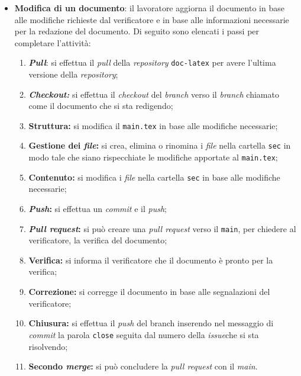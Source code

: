 \begin{itemize}
	\item \textbf{Modifica di un documento}: il lavoratore aggiorna il documento
	      in base alle modifiche richieste dal verificatore e in base alle
	      informazioni necessarie per la redazione del documento. Di seguito sono
	      elencati i passi per completare l'attività:
	      \begin{enumerate}
		      \item \textbf{\textit{Pull}}: si effettua il \textit{pull}
		            della \textit{repository\g} \texttt{doc-latex} per avere
		            l'ultima versione della \textit{repository\g};

		      \item \textbf{\textit{Checkout:}} si effettua il
		            \textit{checkout} del \textit{branch} verso il
		            \textit{branch} chiamato come il documento che si sta
		            redigendo;

		      \item \textbf{Struttura:} si modifica il
		            \texttt{main.tex} in base alle modifiche necessarie;

		      \item \textbf{Gestione dei \textit{file}:} si crea,
		            elimina o rinomina i \textit{file} nella cartella
		            \texttt{sec} in modo tale che siano rispecchiate le
		            modifiche apportate al \texttt{main.tex};

		      \item \textbf{Contenuto:} si modifica i \textit{file}
		            nella cartella \texttt{sec} in base alle modifiche
		            necessarie;

		      \item \textbf{\textit{Push}:} si effettua un
		            \textit{commit} e il \textit{push};

		      \item \textbf{\textit{Pull request}:} si può creare
		            una \textit{pull request} verso il \texttt{main},
		            per chiedere al verificatore, la verifica del documento;

		      \item \textbf{Verifica:} si informa il verificatore
		            che il documento è pronto per la verifica;

		      \item \textbf{Correzione:} si corregge il documento
		            in base alle segnalazioni del verificatore;

		      \item \textbf{Chiusura:} si effettua il \textit{push} del
		            branch inserendo nel messaggio di \textit{commit} la parola
		            \texttt{close} seguita dal numero della \textit{issue}\g che si sta
		            risolvendo;

		      \item \textbf{Secondo \textit{merge}:} si può concludere la
		            \textit{pull request} con il \textit{main}.
	      \end{enumerate}
\end{itemize}

